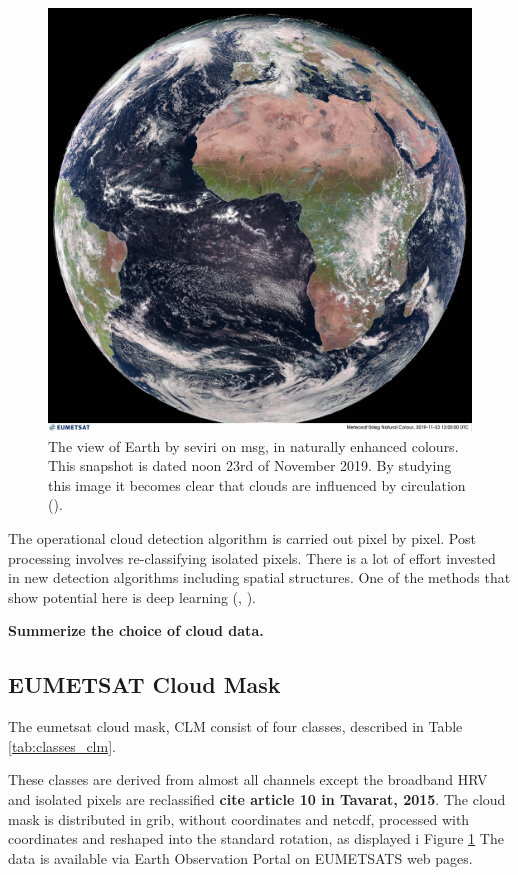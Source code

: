 \begin{figure}[h]
    \centering
    \includegraphics[scale=0.11]{Chapter2_Theory/images/MET10_RGBNatColourEnhncd_FullResolution_20191123120000.jpg}    
    \caption{The view of Earth by \acrshort{seviri} on \acrshort{msg}, in naturally enhanced colours. This snapshot is dated noon 23rd of November 2019. By studying this image it becomes clear that clouds are influenced by circulation  (\cite{eumetcast_image_gallery}).}
    \label{fig:sat_view}
\end{figure}
The operational cloud detection algorithm is carried out pixel by pixel. Post processing involves re-classifying isolated pixels. There is a lot of effort invested in new detection algorithms including spatial structures. One of the methods that show potential here is deep learning (\cite{Dronner2018FastNetworks}, \cite{jeppesen_deep_cloud_masking}).


\textbf{Summerize the choice of cloud data.}


\subsection{EUMETSAT Cloud Mask} \label{sec:EUMETSAT_cloud_mask}
The \acrshort{eumetsat} cloud mask, CLM consist of four classes, described in Table \ref{tab:classes_clm}.


These classes are derived from almost all channels except the broadband HRV and isolated pixels are reclassified \textbf{cite article 10 in Tavarat, 2015}. The cloud mask is distributed in \acrfull{grib},  without coordinates and \acrfull{netcdf}, processed with coordinates and reshaped into the standard rotation, as displayed i Figure \ref{fig:sat_view} The data is available via Earth Observation Portal on EUMETSATS web pages. 
